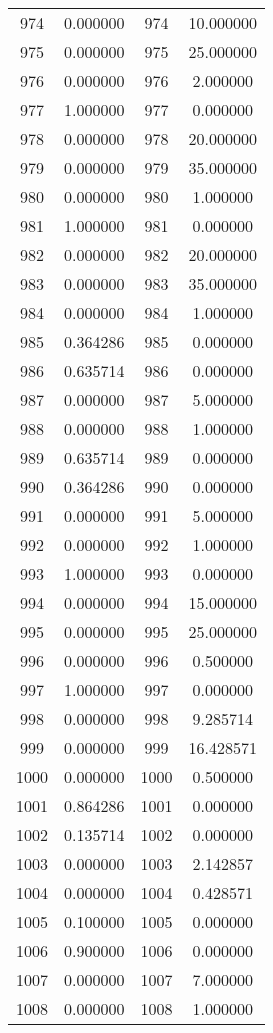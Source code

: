 \documentclass[12pt]{article}
\begin{document}
\begin{longtable}{@{}cccc@{}}
974 & 0.000000 & 974 & 10.000000 \\
975 & 0.000000 & 975 & 25.000000 \\
976 & 0.000000 & 976 & 2.000000 \\
977 & 1.000000 & 977 & 0.000000 \\
978 & 0.000000 & 978 & 20.000000 \\
979 & 0.000000 & 979 & 35.000000 \\
980 & 0.000000 & 980 & 1.000000 \\
981 & 1.000000 & 981 & 0.000000 \\
982 & 0.000000 & 982 & 20.000000 \\
983 & 0.000000 & 983 & 35.000000 \\
984 & 0.000000 & 984 & 1.000000 \\
985 & 0.364286 & 985 & 0.000000 \\
986 & 0.635714 & 986 & 0.000000 \\
987 & 0.000000 & 987 & 5.000000 \\
988 & 0.000000 & 988 & 1.000000 \\
989 & 0.635714 & 989 & 0.000000 \\
990 & 0.364286 & 990 & 0.000000 \\
991 & 0.000000 & 991 & 5.000000 \\
992 & 0.000000 & 992 & 1.000000 \\
993 & 1.000000 & 993 & 0.000000 \\
994 & 0.000000 & 994 & 15.000000 \\
995 & 0.000000 & 995 & 25.000000 \\
996 & 0.000000 & 996 & 0.500000 \\
997 & 1.000000 & 997 & 0.000000 \\
998 & 0.000000 & 998 & 9.285714 \\
999 & 0.000000 & 999 & 16.428571 \\
1000 & 0.000000 & 1000 & 0.500000 \\
1001 & 0.864286 & 1001 & 0.000000 \\
1002 & 0.135714 & 1002 & 0.000000 \\
1003 & 0.000000 & 1003 & 2.142857 \\
1004 & 0.000000 & 1004 & 0.428571 \\
1005 & 0.100000 & 1005 & 0.000000 \\
1006 & 0.900000 & 1006 & 0.000000 \\
1007 & 0.000000 & 1007 & 7.000000 \\
1008 & 0.000000 & 1008 & 1.000000 \\

\end{longtable}
\end{document}
